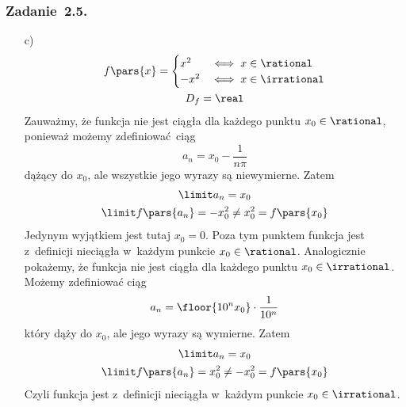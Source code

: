 \subsubsection*{Zadanie~2.5.}
\begin{itemize}
    \item[c)]
        \begin{gather*}
            f\pars{x} = \begin{cases}
                x^2 & \iff x \in \rational\\
                -x^2 & \iff x \in \irrational
            \end{cases}\\
            D_f = \real
        \end{gather*}
        Zauważmy, że funkcja nie jest ciągła dla każdego punktu \(x_0 \in \rational\), ponieważ możemy zdefiniować ciąg
        \begin{equation*}
            a_n = x_0 - \frac{1}{n\pi}
        \end{equation*}
        dążący do \(x_0\), ale wszystkie jego wyrazy są niewymierne. Zatem
        \begin{gather*}
            \limit a_n = x_0\\
            \limit f\pars{a_n} = -x_0^2 \neq x_0^2 = f\pars{x_0}
        \end{gather*}
        Jedynym wyjątkiem jest tutaj \(x_0 = 0\). Poza tym punktem funkcja jest z~definicji nieciągła w~każdym punkcie \(x_0 \in \rational\). Analogicznie pokażemy, że funkcja nie jest ciągła dla każdego punktu \(x_0 \in \irrational\). Możemy zdefiniować ciąg
        \begin{equation*}
            a_n = \floor{10^n x_0} \cdot \frac{1}{10^n}
        \end{equation*}
        który dąży do \(x_0\), ale jego wyrazy są wymierne. Zatem
        \begin{gather*}
            \limit a_n = x_0\\
            \limit f\pars{a_n} = x_0^2 \neq -x_0^2 = f\pars{x_0}
        \end{gather*}
        Czyli funkcja jest z~definicji nieciągła w~każdym punkcie \(x_0 \in \irrational\).
\end{itemize}
